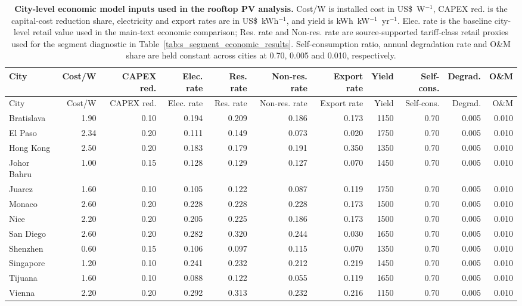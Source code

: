 {\scriptsize
\begin{longtable}{lrrrrrrrrrr}
\caption{\textbf{City-level economic model inputs used in the rooftop PV analysis.} Cost/W is installed cost in US\$~W$^{-1}$, CAPEX red. is the capital-cost reduction share, electricity and export rates are in US\$~kWh$^{-1}$, and yield is kWh~kW$^{-1}$~yr$^{-1}$. Elec. rate is the baseline city-level retail value used in the main-text economic comparison; Res. rate and Non-res. rate are source-supported tariff-class retail proxies used for the segment diagnostic in Table~\ref{tab:s_segment_economic_results}. Self-consumption ratio, annual degradation rate and O\&M share are held constant across cities at 0.70, 0.005 and 0.010, respectively.}\label{tab:s1_economic_model_city_inputs}\\
\toprule
City & Cost/W & CAPEX red. & Elec. rate & Res. rate & Non-res. rate & Export rate & Yield & Self-cons. & Degrad. & O\&M \\
\midrule
\endfirsthead
\toprule
City & Cost/W & CAPEX red. & Elec. rate & Res. rate & Non-res. rate & Export rate & Yield & Self-cons. & Degrad. & O\&M \\
\midrule
\endhead
Bratislava & 1.90 & 0.10 & 0.194 & 0.209 & 0.186 & 0.173 & 1150 & 0.70 & 0.005 & 0.010 \\
El Paso & 2.34 & 0.20 & 0.111 & 0.149 & 0.073 & 0.020 & 1750 & 0.70 & 0.005 & 0.010 \\
Hong Kong & 2.50 & 0.20 & 0.183 & 0.179 & 0.191 & 0.350 & 1350 & 0.70 & 0.005 & 0.010 \\
Johor Bahru & 1.00 & 0.15 & 0.128 & 0.129 & 0.127 & 0.070 & 1450 & 0.70 & 0.005 & 0.010 \\
Juarez & 1.60 & 0.10 & 0.105 & 0.122 & 0.087 & 0.119 & 1750 & 0.70 & 0.005 & 0.010 \\
Monaco & 2.60 & 0.20 & 0.228 & 0.228 & 0.228 & 0.173 & 1500 & 0.70 & 0.005 & 0.010 \\
Nice & 2.20 & 0.20 & 0.205 & 0.225 & 0.186 & 0.173 & 1500 & 0.70 & 0.005 & 0.010 \\
San Diego & 2.60 & 0.20 & 0.282 & 0.320 & 0.244 & 0.030 & 1650 & 0.70 & 0.005 & 0.010 \\
Shenzhen & 0.60 & 0.15 & 0.106 & 0.097 & 0.115 & 0.070 & 1350 & 0.70 & 0.005 & 0.010 \\
Singapore & 1.20 & 0.10 & 0.241 & 0.232 & 0.212 & 0.219 & 1450 & 0.70 & 0.005 & 0.010 \\
Tijuana & 1.60 & 0.10 & 0.088 & 0.122 & 0.055 & 0.119 & 1650 & 0.70 & 0.005 & 0.010 \\
Vienna & 2.20 & 0.20 & 0.292 & 0.313 & 0.232 & 0.216 & 1150 & 0.70 & 0.005 & 0.010 \\
\bottomrule
\end{longtable}
}

